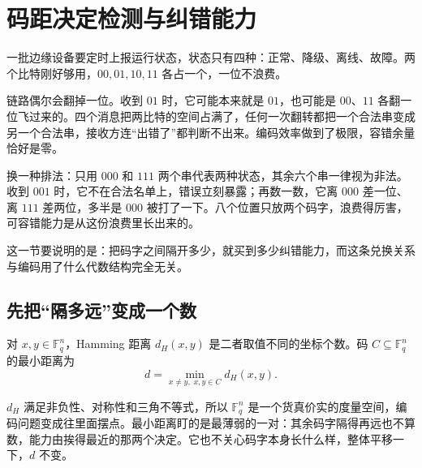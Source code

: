 \section{码距决定检测与纠错能力}
\label{sec:04-Discrete-Mathematics/05-Coding-and-Polynomial-Methods/02}

一批边缘设备要定时上报运行状态，状态只有四种：正常、降级、离线、故障。两个比特刚好够用，\(00,01,10,11\) 各占一个，一位不浪费。

链路偶尔会翻掉一位。收到 \(01\) 时，它可能本来就是 \(01\)，也可能是 \(00\)、\(11\) 各翻一位飞过来的。四个消息把两比特的空间占满了，任何一次翻转都把一个合法串变成另一个合法串，接收方连``出错了''都判断不出来。编码效率做到了极限，容错余量恰好是零。

换一种排法：只用 \(000\) 和 \(111\) 两个串代表两种状态，其余六个串一律视为非法。收到 \(001\) 时，它不在合法名单上，错误立刻暴露；再数一数，它离 \(000\) 差一位、离 \(111\) 差两位，多半是 \(000\) 被打了一下。八个位置只放两个码字，浪费得厉害，可容错能力是从这份浪费里长出来的。

这一节要说明的是：把码字之间隔开多少，就买到多少纠错能力，而这条兑换关系与编码用了什么代数结构完全无关。

\subsection{先把``隔多远''变成一个数}

\begin{definition}
对 \(x,y\in\mathbb F_q^n\)，Hamming 距离 \(d_H(x,y)\) 是二者取值不同的坐标个数。码 \(C\subseteq\mathbb F_q^n\) 的最小距离为
\[
d=\min_{x\neq y,\;x,y\in C} d_H(x,y).
\]
\end{definition}

\(d_H\) 满足非负性、对称性和三角不等式，所以 \(\mathbb F_q^n\) 是一个货真价实的度量空间，编码问题变成往里面摆点。最小距离盯的是最薄弱的一对：其余码字隔得再远也不算数，能力由挨得最近的那两个决定。它也不关心码字本身长什么样，整体平移一下，\(d\) 不变。

